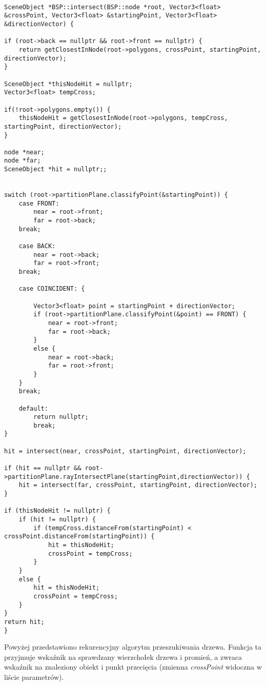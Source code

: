 \begin{lstlisting}

SceneObject *BSP::intersect(BSP::node *root, Vector3<float> &crossPoint, Vector3<float> &startingPoint, Vector3<float> &directionVector) {

if (root->back == nullptr && root->front == nullptr) {
    return getClosestInNode(root->polygons, crossPoint, startingPoint, directionVector);
}

SceneObject *thisNodeHit = nullptr;
Vector3<float> tempCross;

if(!root->polygons.empty()) {
    thisNodeHit = getClosestInNode(root->polygons, tempCross, startingPoint, directionVector);
}

node *near;
node *far;
SceneObject *hit = nullptr;;


switch (root->partitionPlane.classifyPoint(&startingPoint)) {
    case FRONT:
        near = root->front;
        far = root->back;
    break;

    case BACK:
        near = root->back;
        far = root->front;
    break;

    case COINCIDENT: {

        Vector3<float> point = startingPoint + directionVector;
        if (root->partitionPlane.classifyPoint(&point) == FRONT) {
            near = root->front;
            far = root->back;
        }
        else {
            near = root->back;
            far = root->front;
        }
    }
    break;

    default:
        return nullptr;
        break;
}

hit = intersect(near, crossPoint, startingPoint, directionVector);

if (hit == nullptr && root->partitionPlane.rayIntersectPlane(startingPoint,directionVector)) {
    hit = intersect(far, crossPoint, startingPoint, directionVector);
}

if (thisNodeHit != nullptr) {
    if (hit != nullptr) {
        if (tempCross.distanceFrom(startingPoint) < crossPoint.distanceFrom(startingPoint)) {
            hit = thisNodeHit;
            crossPoint = tempCross;
        }
    }
    else {
        hit = thisNodeHit;
        crossPoint = tempCross;
    }
}
return hit;
}

\end{lstlisting}

Powyżej przedstawiono rekurencyjny algorytm przeszukiwania drzewa. Funkcja ta przyjmuje wskaźnik na sprawdzany wierzchołek drzewa i promień, a zwraca wskaźnik na znaleziony obiekt i punkt przecięcia (zmienna \emph{crossPoint} widoczna w liście parametrów).


